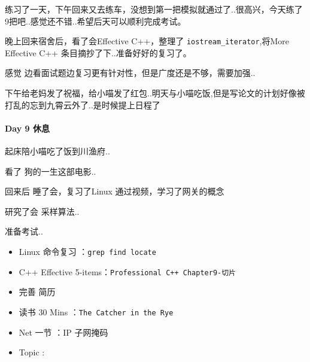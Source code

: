 \documentclass[UTF8,a4paper,8pt]{ctexart}
\begin{document}
	 	 练习了一天，下午回来又去练车，没想到第一把模拟就通过了..很高兴，今天练了9把吧..感觉还不错..希望后天可以顺利完成考试。
	 	 
	 	 晚上回来宿舍后，看了会Effective C++，整理了 \verb|iostream_iterator|,将More Effective C++ 条目摘抄了下..准备好好的复习了。
	 	 
	 	 感觉 边看面试题边复习更有针对性，但是广度还是不够，需要加强..
	 	 
	 	 下午给老妈发了祝福，给小喵发了红包..明天与小喵吃饭,但是写论文的计划好像被打乱的忘到九霄云外了..是时候提上日程了
 	 \paragraph{Day 9  休息     \quad     }
 	 
		  起床陪小喵吃了饭到川渔府..
		  
		  看了 狗的一生这部电影.. 
		  
		  回来后 睡了会，复习了Linux 通过视频，学习了网关的概念
		  
		  研究了会 采样算法..
		  
		  准备考试..
	 	  \begin{itemize}[itemindent = 1em]
	 	  	\renewcommand\labelitemi{\makebox[0pt][l]{$\square$}\hspace{1em}} 
	 	  	\renewcommand\labelitemi{\makebox[0pt][l]{$\square$}\raisebox{.15ex}{\hspace{0.1em}$\checkmark$}}	 	
	 	  	\item   Linux 命令复习 ：\verb|grep find locate|
	 	  	\item   C++ Effective 5-items：\verb|Professional C++ Chapter9-切片|
	 	  	\item   完善 简历
	 	  	
	 	  	\item   读书  30 Mins	：\verb|The Catcher in the Rye|	
	 	  	\item   Net 一节 ：IP 子网掩码
	 	  	\renewcommand\labelitemi{\makebox[0pt][l]{$\square$}\hspace{1em}} 	
	 	  	
	 	  	\renewcommand\labelitemi{\makebox[0pt][l]{$\square$}\raisebox{.15ex}{\hspace{0.1em}$\checkmark$}}
	 	  	\item   Topic : 
	 	  \end{itemize}
\end{document}
